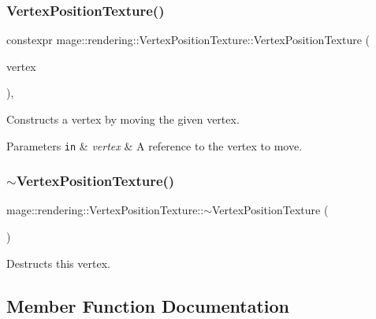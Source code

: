 \subsubsection{\texorpdfstring{Vertex\+Position\+Texture()}{VertexPositionTexture()}\hspace{0.1cm}{\footnotesize\ttfamily [4/4]}}
{\footnotesize\ttfamily constexpr mage\+::rendering\+::\+Vertex\+Position\+Texture\+::\+Vertex\+Position\+Texture (\begin{DoxyParamCaption}\item[{\hyperlink{structmage_1_1rendering_1_1_vertex_position_texture}{Vertex\+Position\+Texture} \&\&}]{vertex }\end{DoxyParamCaption})\hspace{0.3cm}{\ttfamily [default]}, {\ttfamily [noexcept]}}

Constructs a vertex by moving the given vertex.


\begin{DoxyParams}[1]{Parameters}
\mbox{\tt in}  & {\em vertex} & A reference to the vertex to move. \\
\hline
\end{DoxyParams}
\hypertarget{structmage_1_1rendering_1_1_vertex_position_texture_afe6c0d05326d35c13f5d505065235691}{}\label{structmage_1_1rendering_1_1_vertex_position_texture_afe6c0d05326d35c13f5d505065235691} 
\subsubsection{\texorpdfstring{$\sim$\+Vertex\+Position\+Texture()}{~VertexPositionTexture()}}
{\footnotesize\ttfamily mage\+::rendering\+::\+Vertex\+Position\+Texture\+::$\sim$\+Vertex\+Position\+Texture (\begin{DoxyParamCaption}{ }\end{DoxyParamCaption})\hspace{0.3cm}{\ttfamily [default]}}

Destructs this vertex. 

\subsection{Member Function Documentation}
\hypertarget{structmage_1_1rendering_1_1_vertex_position_texture_a66d7754ec7a271ec3af1883774876646}{}\label{structmage_1_1rendering_1_1_vertex_position_texture_a66d7754ec7a271ec3af1883774876646} 
